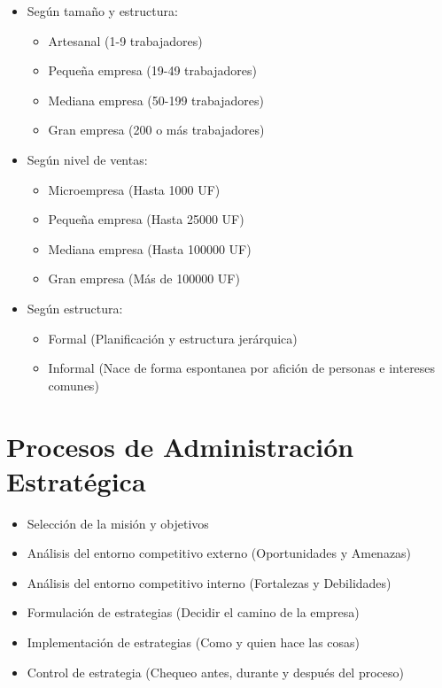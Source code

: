 \documentclass{templateNote}
\begin{document}
\begin{itemize}
\begin{itemize}
        \end{itemize}
    \item Según tamaño y estructura:
        \begin{itemize}
            \item Artesanal (1-9 trabajadores)
            \item Pequeña empresa (19-49 trabajadores)
            \item Mediana empresa (50-199 trabajadores)
            \item Gran empresa (200 o más trabajadores)
        \end{itemize}
    \item Según nivel de ventas:
        \begin{itemize}
            \item Microempresa (Hasta 1000 UF)
            \item Pequeña empresa (Hasta 25000 UF)
            \item Mediana empresa (Hasta 100000 UF)
            \item Gran empresa (Más de 100000 UF)
        \end{itemize}
    \item Según estructura:
        \begin{itemize}
            \item Formal (Planificación y estructura jerárquica)
            \item Informal (Nace de forma espontanea por afición de personas e intereses comunes)   
        \end{itemize}
\end{itemize}

\section{Procesos de Administración Estratégica}
\begin{itemize}
    \item Selección de la misión y objetivos
    \item Análisis del entorno competitivo externo (Oportunidades y Amenazas)       
    \item Análisis del entorno competitivo interno (Fortalezas y Debilidades)
    \item Formulación de estrategias (Decidir el camino de la empresa)
    \item Implementación de estrategias (Como y quien hace las cosas)
    \item Control de estrategia (Chequeo antes, durante y después del proceso)
\end{itemize}
\end{document}

